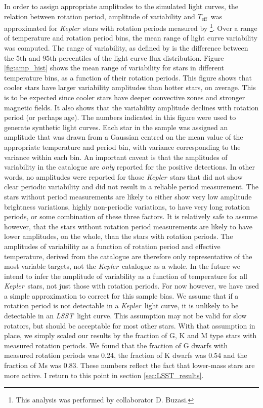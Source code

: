 \documentclass[useAMS, usenatbib, preprint, 12pt]{aastex}
\newcommand{\kepler}{{\it Kepler}}
\newcommand{\LSST}{{\it LSST}}
\newcommand{\teff}{$T_{\mathrm{eff}}$}
\begin{document}
In order to assign appropriate amplitudes to the simulated light curves,
the relation between rotation period, amplitude of variability
and \teff\ was approximated for \kepler\ stars with rotation periods
measured by \citet{Mcquillan2014}\footnote{This analysis was performed by
collaborator D. Buzasi.}.
Over a range of temperature and rotation period bins, the mean range of light
curve variability was computed.
The range of variability, as defined by \citet{Mcquillan2014} is the
difference between the 5th and 95th percentiles of the light curve flux
distribution.
Figure \ref{fig:amp_hist} shows the mean range of variability for stars in
different temperature bins, as a function of their rotation periods.
This figure shows that cooler stars have larger variability amplitudes than
hotter stars, on average.
This is to be expected since cooler stars have deeper convective zones and
stronger magnetic fields.
It also shows that the variability amplitude declines with rotation period
(or perhaps age).
The numbers indicated in this figure were used to generate synthetic light
curves.
Each star in the sample was assigned an amplitude that was drawn from a
Gaussian centred on the mean value of the appropriate temperature and period
bin, with variance corresponding to the variance within each bin.
An important caveat is that the amplitudes of variability in the
\citet{Mcquillan2014} catalogue are {\it only} reported for the positive
detections.
In other words, no amplitudes were reported for those \kepler\ stars that did
not show clear periodic variability and did not result in a reliable period
measurement.
The stars without period measurements are likely to either show very low
amplitude brightness variations, highly non-periodic variations, to have very
long rotation periods, or some combination of these three factors.
It is relatively safe to assume however, that the stars without rotation
period measurements are likely to have lower amplitudes, on the whole, than
the stars with rotation periods.
The amplitudes of variability as a function of rotation period and effective
temperature, derived from the \citet{Mcquillan2014} catalogue are therefore
only representative of the most variable targets, not the \kepler\ catalogue
as a whole.
In the future we intend to infer the amplitude of variability as a function of
temperature for all \kepler\ stars, not just those with rotation periods.
For now however, we have used a simple approximation to correct for this
sample bias.
We assume that if a rotation period is not detectable in a \kepler\ light
curve, it is unlikely to be detectable in an \LSST\ light curve.
This assumption may not be valid for slow rotators, but should be acceptable
for most other stars.
With that assumption in place, we simply scaled our results by the fraction of
G, K and M type stars with measured rotation periods.
We found that the fraction of G dwarfs with measured rotation periods was
0.24, the fraction of K dwarfs was 0.54 and the fraction of Ms was 0.83.
These numbers reflect the fact that lower-mass stars are more active.
I return to this point in section \textsection\ref{sec:LSST_results}.
\end{document}
